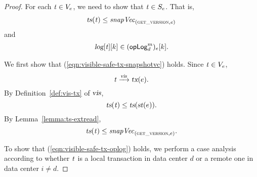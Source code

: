 \begin{proof}  \label{proof:visible-safe-tx}
  For each $\mathit{t} \in V_{e}$,
  we need to show that $\mathit{t} \in S_{e}$.
  That is,
  \begin{gather}
    \textsl{ts}(\mathit{t}) \le \mathit{snapVec}_{(\textsc{get\_version}, e)}
    \label{eqn:visible-safe-tx-snapshotvc}
  \end{gather}
  and
  \begin{gather}
    \textsl{log}[\mathit{t}][k] \in ({\sf opLog}^{m}_{d})_{e}[k].
    \label{eqn:visible-safe-tx-oplog}
  \end{gather}

  We first show that (\ref{eqn:visible-safe-tx-snapshotvc}) holds.
  Since $\mathit{t} \in V_{e}$,
  \[
    \mathit{t} \xrightarrow{\textsl{vis}} \textsl{tx}(e).
  \]
  By Definition~\ref{def:vis-tx} of $\textsl{vis}$,
  \[
    \textsl{ts}(\mathit{t}) \le \textsl{ts}(\textsl{st}(e)).
  \]
  By Lemma~\ref{lemma:ts-extread},
  \[
    \textsl{ts}(\mathit{t}) \le \mathit{snapVec}_{(\textsc{get\_version}, e)}.
  \]

  To show that (\ref{eqn:visible-safe-tx-oplog}) holds,
  we perform a case analysis according to
  whether $\mathit{t}$ is a local transaction in data center $d$
  or a remote one in data center $i \neq d$.


\end{proof}
